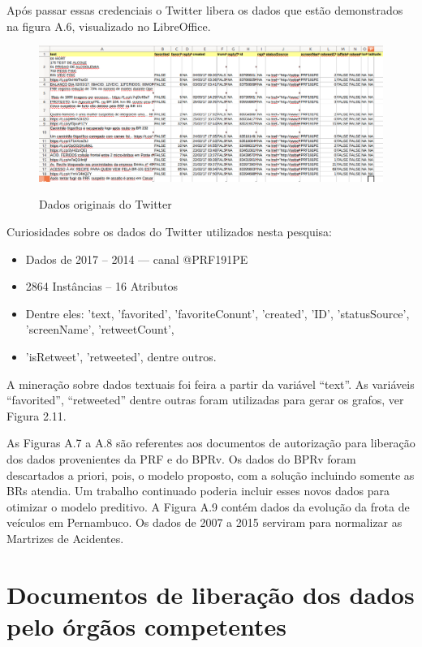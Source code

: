 Após passar essas credenciais o Twitter libera os dados que estão demonstrados na figura A.6, visualizado no LibreOffice.

\begin{figure}[ht!]
	\centering
	\caption{Dados originais do Twitter}
	\includegraphics[width=0.9\linewidth]{Figuras/Anexos/tweetPRF}
	\label{fig:workflow Twitter}
\end{figure}

Curiosidades sobre os dados do Twitter utilizados nesta pesquisa:
\begin{itemize}
	\item Dados de 2017 -- 2014 --- canal @PRF191PE
	\item 2864 Instâncias -- 16 Atributos
	\item Dentre eles: 'text, 'favorited', 'favoriteConunt', 'created', 'ID', 'statusSource', 'screenName', 'retweetCount',
	\item 'isRetweet', 'retweeted', dentre outros.		
\end{itemize}

A mineração sobre dados textuais foi feira a partir da variável ``text''. As variáveis ``favorited'', ``retweeted'' dentre outras foram utilizadas para gerar os grafos, ver Figura 2.11.

As Figuras A.7 a A.8 são referentes aos documentos de autorização para liberação dos dados provenientes da PRF e do BPRv.
Os dados do BPRv foram descartados a priori, pois, o modelo proposto, com a solução incluindo somente as BRs atendia. Um trabalho continuado poderia incluir esses novos dados para otimizar o modelo preditivo. A Figura A.9 contém dados da evolução da frota de veículos em Pernambuco. Os dados de 2007 a 2015 serviram para normalizar as Martrizes de Acidentes.


\pagebreak

\section{Documentos de liberação dos dados pelo órgãos competentes}\label{intro:Anexo}

